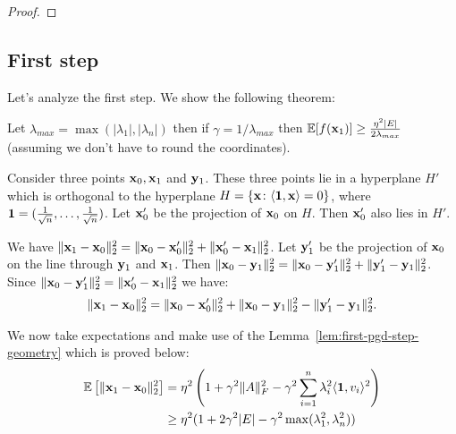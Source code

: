 \begin{proof}
\end{proof}

\subsection{First step}


Let's analyze the first step. We show the following theorem:
\begin{theorem}
	Let $\lambda_{max} = \max(|\lambda_1|, |\lambda_n|)$ then
	if $\gamma = 1/\lambda_{max}$ then $\mathbb E[f(\mathbf x_1)] \ge \frac{\eta^2 |E|}{2 \lambda_{max}}$ (assuming we don't have to round the coordinates).
\end{theorem}


Consider three points $\mathbf x_0, \mathbf x_1$ and $\mathbf y_1$. These three points lie in a hyperplane $H'$ which is orthogonal to the hyperplane $H = \{\mathbf x \colon \langle \mathbf{1}, \mathbf x \rangle = 0\}$, where $\mathbf{1} = (\frac{1}{\sqrt{n}}, \dots, \frac{1}{\sqrt{n}})$.
Let $\mathbf x_0'$ be the projection of $\mathbf x_0$ on $H$.
Then $\mathbf x_0'$ also lies in $H'$.

We have $\|\mathbf x_1 - \mathbf x_0\|_2^2 = \|\mathbf x_0 - \mathbf x'_0\|_2^2 + \|\mathbf x_0' - \mathbf x_1\|_2^2$.
Let $\mathbf y_1'$ be the projection of $\mathbf x_0$ on the line through $\mathbf y_1$ and $\mathbf x_1$.
Then $\|\mathbf x_0 - \mathbf y_1\|_2^2 = \|\mathbf x_0 - \mathbf y_1'\|_2^2 + \|\mathbf y_1' - \mathbf y_1\|_2^2$.
Since $\|\mathbf x_0 - \mathbf y_1'\|_2^2 = \|\mathbf x_0' - \mathbf x_1\|_2^2$ we have:
\begin{align*}
\|\mathbf x_1 - \mathbf x_0\|_2^2 = \|\mathbf x_0 - \mathbf x_0'\|_2^2 + \|\mathbf x_0 - \mathbf y_1\|_2^2 - \|\mathbf y_1' - \mathbf y_1\|_2^2.
\end{align*}

We now take expectations and make use of the Lemma~\ref{lem:first-pgd-step-geometry} which is proved below:
\begin{align*}
\mathbb E\left[\|\mathbf x_1 - \mathbf x_0\|_2^2\right] &= \eta^2 \left(1 + \gamma^2 \|A\|_F^2 - \gamma^2 \sum_{i = 1}^n \lambda_i^2 \langle \mathbf{1}, v_i\rangle^2\right) \\
& \ge \eta^2 (1 + 2 \gamma^2 |E| - \gamma^2 \max(\lambda_1^2, \lambda_n^2))
\end{align*}

